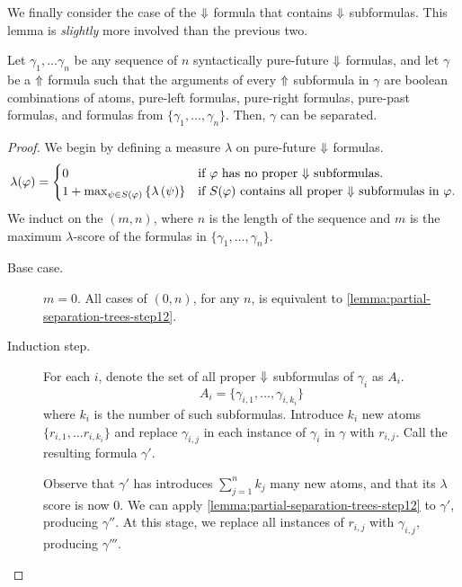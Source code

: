 \documentclass[a4paper,UKenglish,cleveref, autoref, thm-restate, numberwithinsect]{lipics-v2021}
\def\Uarrow{\ensuremath\mathord{\Uparrow}}
\def\Darrow{\ensuremath\mathord{\Downarrow}}
\begin{document}
We finally consider the case of the $\Darrow$ formula that contains $\Darrow$ subformulas. This lemma is \textit{slightly} more involved than the previous two.
\begin{lemma}
    \label{lemma:partial-separation-trees-step13}
    Let $\gamma_1, \ldots \gamma_n$ be any sequence of $n$ syntactically pure-future $\Darrow$ formulas, and let $\gamma$ be a $\Uarrow$ formula such that the arguments of every $\Uarrow$ subformula in $\gamma$ are boolean combinations of atoms, pure-left formulas, pure-right formulas, pure-past formulas, and formulas from $\{\gamma_1, \ldots, \gamma_n\}$. Then, $\gamma$ can be separated.
\end{lemma}
\begin{proof}
    We begin by defining a measure $\lambda$ on pure-future $\Darrow$ formulas.
    \begin{equation*}
        \lambda(\varphi) = \begin{cases}
            0 & \text{if $\varphi$ has no proper $\Darrow$ subformulas.}\\
            1 + \max_{\psi \in S(\varphi)} \left\{\lambda\left(\psi\right)\right\} & \text{if $S(\varphi)$ contains all proper $\Darrow$ subformulas in $\varphi$.}
        \end{cases}
    \end{equation*}
    We induct on the $(m, n)$, where $n$ is the length of the sequence and $m$ is the maximum $\lambda$-score of the formulas in $\{\gamma_1, \ldots, \gamma_n\}$.

    \begin{description}
        \item[Base case.] $m = 0$. All cases of $(0, n)$, for any $n$, is equivalent to \cref{lemma:partial-separation-trees-step12}.
        \item[Induction step.] For each $i$, denote the set of all proper $\Darrow$ subformulas of $\gamma_i$ as $A_i$.
        \begin{equation*}
            A_i = \{ \gamma_{i, 1}, \ldots, \gamma_{i, k_i} \}
        \end{equation*}
        where $k_i$ is the number of such subformulas. Introduce $k_i$ new atoms $\{r_{i, 1}, \ldots r_{i, k_i}\}$ and replace $\gamma_{i, j}$ in each instance of $\gamma_i$ in $\gamma$ with $r_{i, j}$. Call the resulting formula $\gamma'$.

        Observe that $\gamma'$ has introduces $\sum_{j = 1}^{n} k_j$ many new atoms, and that its $\lambda$ score is now 0. We can apply \cref{lemma:partial-separation-trees-step12} to $\gamma'$, producing $\gamma''$. At this stage, we replace all instances of $r_{i, j}$ with $\gamma_{i, j}$, producing $\gamma'''$.


\end{description}
\end{proof}
\end{document}
